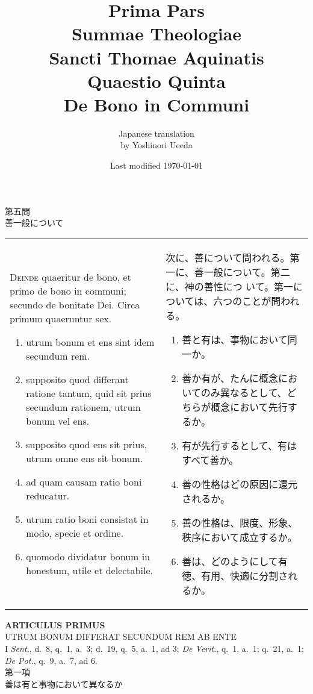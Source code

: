 \documentclass[10pt]{jsarticle}
\title{{\bf Prima Pars}\\{\HUGE Summae Theologiae}\\Sancti Thomae
Aquinatis\\Quaestio Quinta\\{\bf De Bono in Communi}}
\author{Japanese translation\\by Yoshinori {\sc Ueeda}}
\date{Last modified \today}
\begin{document}
\maketitle
\begin{center}
 {\Large 第五問\\善一般について}
\end{center}
\begin{longtable}{p{21em}p{21em}}
{\scshape Deinde} quaeritur de bono, et primo de bono in communi;
 secundo de bonitate Dei. Circa primum quaeruntur sex. 
\begin{enumerate}
 \item utrum
 bonum et ens sint idem secundum rem.
 \item supposito quod differant
 ratione tantum, quid sit prius secundum rationem, utrum bonum vel
 ens.
 \item supposito quod ens sit prius, utrum omne ens sit
 bonum.
 \item ad quam causam ratio boni reducatur. 
 \item utrum ratio
 boni consistat in modo, specie et ordine.
 \item quomodo dividatur
 bonum in honestum, utile et delectabile.
\end{enumerate}

&

次に、善について問われる。第一に、善一般について。第二に、神の善性につ
いて。第一については、六つのことが問われる。

\begin{enumerate}
 \item 善と有は、事物において同一か。
 \item 善か有が、たんに概念においてのみ異なるとして、どちらが概念において先行するか。       
 \item 有が先行するとして、有はすべて善か。
 \item 善の性格はどの原因に還元されるか。
 \item 善の性格は、限度、形象、秩序において成立するか。
 \item 善は、どのようにして有徳、有用、快適に分割されるか。
\end{enumerate}

\end{longtable}

\newpage
{}

\begin{center}
 {\Large {\bf ARTICULUS PRIMUS}}\\
 {\large UTRUM BONUM DIFFERAT SECUNDUM REM AB ENTE}\\
 {\footnotesize I {\itshape Sent.}, d.~8, q.~1, a.~3; d.~19, q.~5, a.~1,
 ad 3; {\itshape De Verit.}, q.~1, a.~1; q.~21, a.~1; {\itshape De
 Pot.}, q.~9, a.~7, ad 6.}\\
 {\Large 第一項\\善は有と事物において異なるか}
\end{center}
\end{document}
